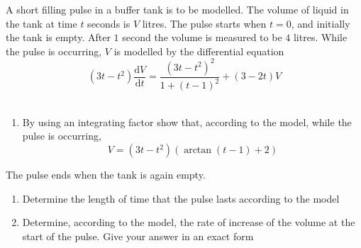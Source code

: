 \documentclass[leqno]{article}
\begin{document}
\begin{enumerate}[
  label=\textbf{\arabic*.},
  leftmargin=*,
  topsep=0pt,
  partopsep=0pt,
  parsep=0pt
]
\newpage

\questionitem

A short filling pulse in a buffer tank is to be modelled. The volume of liquid in the tank at time $t$ seconds is $V$ litres. The pulse starts when $t=0$, and initially the tank is empty. After $1$ second the volume is measured to be $4$ litres. While the pulse is occurring, $V$ is modelled by the differential equation
\[
(3t-t^2)\frac{\mathrm{d}V}{\mathrm{d}t}=\frac{(3t-t^2)^2}{1+(t-1)^2}+(3-2t)V 
    \]\\
\begin{enumerate}[label=\textbf{(\alph*)}]
  \item By using an integrating factor show that, according to the model, while the pulse is occurring,
  \[
  V=(3t-t^2)\left(\arctan(t-1)+2\right)
  \] 
\end{enumerate}
The pulse ends when the tank is again empty. \\
\begin{enumerate}[label=\textbf{(\alph*)}, resume]
  \item Determine the length of time that the pulse lasts according to the model  \\
  \item Determine, according to the model, the rate of increase of the volume at the start of the pulse. Give your answer in an exact form  \\
\end{enumerate}

\newpage

\questionitem


\end{enumerate}
\end{document}
